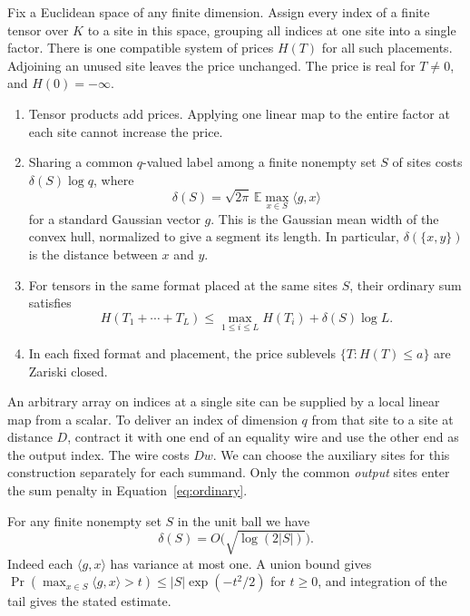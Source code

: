 \begin{theorem}\label{thm:width}
Fix a Euclidean space of any finite dimension. Assign every index of a
finite tensor over $K$ to a site in this space, grouping all indices at
one site into a single factor. There is one compatible system of prices
$H(T)$ for all such placements. Adjoining an unused site leaves the
price unchanged. The price is real for $T\ne0$, and $H(0)=-\infty$.
\begin{enumerate}[leftmargin=*,itemsep=.3ex]
\item Tensor products add prices. Applying one linear map to the entire
factor at each site cannot increase the price.
\item Sharing a common $q$-valued label among a finite nonempty set $S$
of sites costs $\delta(S)\log q$, where
\[
       \delta(S)=\sqrt{2\pi}\,\mathbb E\max_{x\in S}\langle g,x\rangle
\]
for a standard Gaussian vector $g$. This is the Gaussian mean width
of the convex hull, normalized to give a segment its length. In particular, $\delta(\{x,y\})$
is the distance between $x$ and $y$.
\item For tensors in the same format placed at the same sites $S$,
their ordinary sum satisfies
\begin{equation}\label{eq:ordinary}
 H(T_1+\cdots+T_L)\le \max_{1\le i\le L} H(T_i)+\delta(S)\log L .
\end{equation}
\item In each fixed format and placement, the price sublevels
$\{T:H(T)\le a\}$ are Zariski closed.
\end{enumerate}
\end{theorem}

An arbitrary array on indices at a single site can be supplied by a
local linear map from a scalar. To deliver an index of dimension $q$
from that site to a site at distance $D$, contract it with one end of an
equality wire and use the other end as the output index. The wire costs
$Dw$. We can choose the auxiliary sites for this construction separately
for each summand. Only the common \emph{output} sites enter the sum
penalty in Equation~\eqref{eq:ordinary}.

For any finite nonempty set $S$ in the unit ball we have
\begin{equation}\label{eq:width-ball}
                         \delta(S)=O\bigl(\sqrt{\log(2|S|)}\bigr).
\end{equation}
Indeed each $\langle g,x\rangle$ has variance at most one. A union bound
gives $\Pr(\max_{x\in S}\langle g,x\rangle>t)\le |S|\exp(-t^2/2)$ for
$t\ge0$, and integration of the tail gives the stated estimate.

